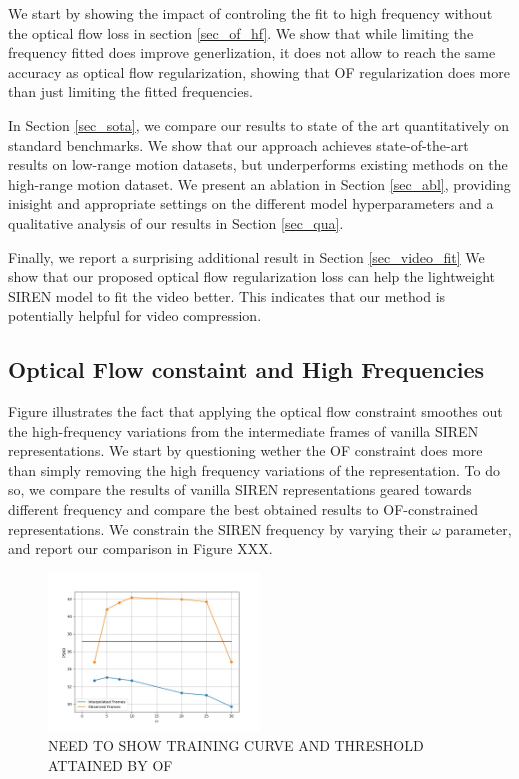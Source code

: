 \documentclass{article}
\begin{document}
We start by showing the impact of controling the fit to high frequency without the optical flow loss in section \ref{sec_of_hf}.
We show that while limiting the frequency fitted does improve generlization, it does not allow to reach
the same accuracy as optical flow regularization, showing that OF regularization does more than just limiting the fitted frequencies.

In Section \ref{sec_sota}, we compare our results to state of the art quantitatively on standard benchmarks.
We show that our approach achieves state-of-the-art results on low-range motion datasets, but underperforms existing methods on the high-range motion dataset.
We present an ablation in Section \ref{sec_abl}, providing inisight and appropriate settings on the different model hyperparameters and a qualitative analysis of our results in Section \ref{sec_qua}.

Finally, we report a surprising additional result in Section \ref{sec_video_fit}
We show that our proposed optical flow regularization loss can help the lightweight SIREN model to fit the video better. 
This indicates that our method is potentially helpful for video compression.

\subsection{Optical Flow constaint and High Frequencies}

Figure \label{sec_of_hf} illustrates the fact that applying the optical flow constraint smoothes out the high-frequency variations
from the intermediate frames of vanilla SIREN representations.
We start by questioning wether the OF constraint does more than simply removing the high frequency variations of the representation.
To do so, we compare the results of vanilla SIREN representations geared towards different frequency and compare the
best obtained results to OF-constrained representations.
We constrain the SIREN frequency by varying their $\omega$ parameter,
and report our comparison in Figure XXX.

\begin{figure}[t]
\centering
\includegraphics[width=0.5\textwidth]{"omega_wo_of"}
\caption{NEED TO SHOW TRAINING CURVE AND THRESHOLD ATTAINED BY OF}
\end{figure}
\end{document}
